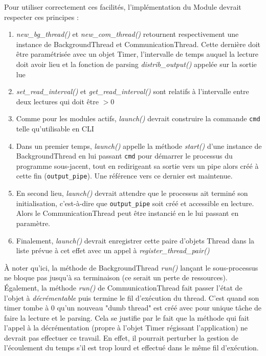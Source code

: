 \documentclass[]{article}
\begin{document}
Pour utiliser correctement ces facilités, l'implémentation du Module devrait respecter ces principes :
\begin{enumerate}
\item \textit{new\_bg\_thread()} et \textit{new\_com\_thread()} retournent respectivement une instance de BackgroundThread et CommunicationThread. Cette dernière doit être paramétrisée avec un objet Timer, l'intervalle de temps auquel la lecture doit avoir lieu et la fonction de parsing \textit{distrib\_output()} appelée sur la sortie lue
\vspace{0.2cm}
\item \textit{set\_read\_interval()} et \textit{get\_read\_interval()} sont relatifs à l'intervalle entre deux lectures qui doit être $> 0$
\vspace{0.2cm}
\item Comme pour les modules actifs, \textit{launch()} devrait construire la commande \texttt{cmd} telle qu'utilisable en CLI
\vspace{0.2cm}
\item Dans un premier temps, \textit{launch()} appelle la méthode \textit{start()} d'une instance de BackgroundThread en lui passant \texttt{cmd} pour démarrer le processus du programme sous-jacent, tout en redirigeant sa sortie vers un pipe alors créé à cette fin (\texttt{output\_pipe}). Une référence vers ce dernier est maintenue.
\vspace{0.2cm}
\item En second lieu, \textit{launch()} devrait attendre que le processus ait terminé son initialisation, c'est-à-dire que \texttt{output\_pipe} soit créé et accessible en lecture. Alors le CommunicationThread peut être instancié en le lui passant en paramètre.
\vspace{0.2cm}
\item Finalement, \textit{launch()} devrait enregistrer cette paire d'objets Thread dans la liste prévue à cet effet avec un appel à \textit{register\_thread\_pair()}
\end{enumerate}

\vspace{0.2cm}

À noter qu'ici, la méthode de BackgroundThread \textit{run()} lançant le sous-processus ne bloque pas jusqu'à sa terminaison (ce serait un perte de ressources). Également, la méthode \textit{run()} de CommunicationThread fait passer l'état de l'objet à \textit{décrémentable} puis termine le fil d'exécution du thread. C'est quand son timer tombe à 0 qu'un nouveau "dumb thread" est créé avec pour unique tâche de faire la lecture et le parsing. Cela se justifie par le fait que la méthode qui fait l'appel à la décrémentation (propre à l'objet Timer régissant l'application) ne devrait pas effectuer ce travail. En effet, il pourrait perturber la gestion de l'écoulement du temps s'il est trop lourd et effectué dans le même fil d'exécution. 
\newpage
\end{document}
